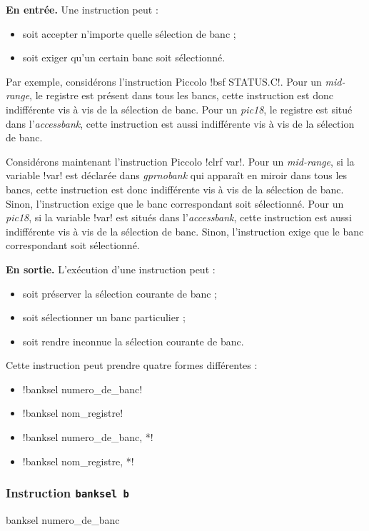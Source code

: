 \textbf{En entrée.} Une instruction peut :
\begin{itemize}
  \item soit accepter n'importe quelle sélection de banc ;
  \item soit exiger qu'un certain banc soit sélectionné.
\end{itemize}

Par exemple, considérons l'instruction Piccolo \pic!bsf STATUS.C!. Pour un \emph{mid-range}, le registre  est présent dans tous les bancs, cette instruction est donc indifférente vis à vis de la sélection de banc. Pour un \emph{pic18}, le registre  est situé dans l'\emph{accessbank}, cette instruction est aussi indifférente vis à vis de la sélection de banc. 

Considérons maintenant l'instruction Piccolo \pic!clrf var!. Pour un \emph{mid-range}, si la variable \pic!var! est déclarée dans \emph{gprnobank} qui apparaît en miroir dans tous les bancs, cette instruction est donc indifférente vis à vis de la sélection de banc. Sinon, l'instruction exige que le banc correspondant soit sélectionné. Pour un \emph{pic18}, si la variable \pic!var! est situés dans l'\emph{accessbank}, cette instruction est aussi indifférente vis à vis de la sélection de banc.  Sinon, l'instruction exige que le banc correspondant soit sélectionné. 


\textbf{En sortie.} L'exécution d'une instruction peut :
\begin{itemize}
  \item soit préserver la sélection courante de banc ;
  \item soit sélectionner un banc particulier ;
  \item soit rendre inconnue la sélection courante de banc.
\end{itemize}


Cette instruction peut prendre quatre formes différentes :
\begin{itemize}
  \item \pic!banksel numero_de_banc!
  \item \pic!banksel nom_registre!
  \item \pic!banksel numero_de_banc, *!
  \item \pic!banksel nom_registre, *!
\end{itemize}


\subsubsection{Instruction \texttt{banksel b}}
\begin{piccolo}
banksel numero_de_banc
\end{piccolo}

